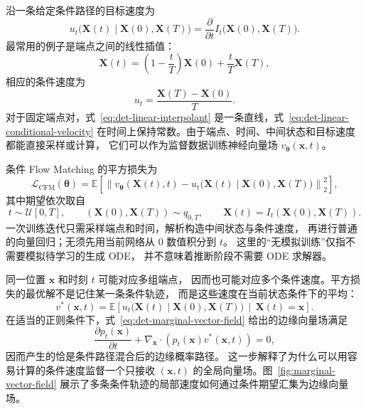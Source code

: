沿一条给定条件路径的目标速度为
\begin{equation}
    u_t\bigl(
        \mathbf{X}(t)
        \mid\mathbf{X}(0),\mathbf{X}(T)
    \bigr)
    =
    \frac{\partial}{\partial t}
    I_t\bigl(\mathbf{X}(0),\mathbf{X}(T)\bigr).
    \label{eq:det-conditional-velocity}
\end{equation}
最常用的例子是端点之间的线性插值：
\begin{equation}
    \mathbf{X}(t)
    =
    \left(1-\frac{t}{T}\right)\mathbf{X}(0)
    +
    \frac{t}{T}\mathbf{X}(T),
    \label{eq:det-linear-interpolant}
\end{equation}
相应的条件速度为
\begin{equation}
    u_t
    =
    \frac{\mathbf{X}(T)-\mathbf{X}(0)}{T}.
    \label{eq:det-linear-conditional-velocity}
\end{equation}
对于固定端点对，式~\eqref{eq:det-linear-interpolant}
是一条直线，式~\eqref{eq:det-linear-conditional-velocity}
在时间上保持常数。由于端点、时间、中间状态和目标速度都能直接采样或计算，
它们可以作为监督数据训练神经向量场
\(v_{\boldsymbol{\theta}}(\mathbf{x},t)\)。

条件 Flow Matching 的平方损失为
\begin{equation}
    \mathcal{L}_{\mathrm{CFM}}(\boldsymbol{\theta})
    =
    \mathbb{E}
    \left[
        \left\|
            v_{\boldsymbol{\theta}}(\mathbf{X}(t),t)
            -
            u_t\bigl(
                \mathbf{X}(t)
                \mid\mathbf{X}(0),\mathbf{X}(T)
            \bigr)
        \right\|_2^2
    \right],
    \label{eq:det-cfm-loss}
\end{equation}
其中期望依次取自
\[
    t\sim\mathcal{U}[0,T],
    \qquad
    (\mathbf{X}(0),\mathbf{X}(T))\sim q_{0,T},
    \qquad
    \mathbf{X}(t)=I_t(\mathbf{X}(0),\mathbf{X}(T)).
\]
一次训练迭代只需采样端点和时间，解析构造中间状态与条件速度，
再进行普通的向量回归；无须先用当前网络从 \(0\) 数值积分到 \(t\)。
这里的“无模拟训练”仅指不需要模拟待学习的生成 ODE，
并不意味着推断阶段不需要 ODE 求解器。

同一位置 \(\mathbf{x}\) 和时刻 \(t\) 可能对应多组端点，
因而也可能对应多个条件速度。平方损失的最优解不是记住某一条条件轨迹，
而是这些速度在当前状态条件下的平均：
\begin{equation}
    v^{*}(\mathbf{x},t)
    =
    \mathbb{E}
    \left[
        u_t\bigl(
            \mathbf{X}(t)
            \mid\mathbf{X}(0),\mathbf{X}(T)
        \bigr)
        \,\middle|\,
        \mathbf{X}(t)=\mathbf{x}
    \right].
    \label{eq:det-marginal-vector-field}
\end{equation}
在适当的正则条件下，式~\eqref{eq:det-marginal-vector-field}
给出的边缘向量场满足
\begin{equation}
    \frac{\partial p_t(\mathbf{x})}{\partial t}
    +
    \nabla_{\mathbf{x}}\cdot
    \left(
        p_t(\mathbf{x})v^{*}(\mathbf{x},t)
    \right)
    =
    0,
    \label{eq:det-fm-continuity}
\end{equation}
因而产生的恰是条件路径混合后的边缘概率路径。
这一步解释了为什么可以用容易计算的条件速度监督一个只接收
\((\mathbf{x},t)\) 的全局向量场。图~\ref{fig:marginal-vector-field}
展示了多条条件轨迹的局部速度如何通过条件期望汇集为边缘向量场。


